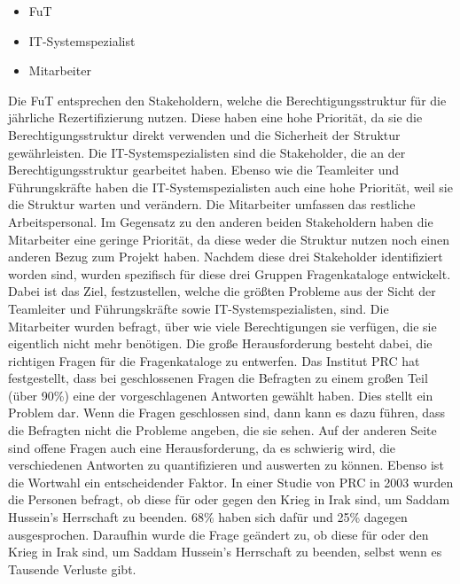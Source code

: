 \begin{itemize}
	\item \ac{FuT}
	\item IT-Systemspezialist
	\item Mitarbeiter
\end{itemize}
Die \ac{FuT} entsprechen den Stakeholdern, welche die Berechtigungsstruktur für die jährliche Rezertifizierung nutzen.
Diese haben eine hohe Priorität, da sie die Berechtigungsstruktur direkt verwenden und die Sicherheit der Struktur gewährleisten.
\newline
Die IT-Systemspezialisten sind die Stakeholder, die an der Berechtigungsstruktur gearbeitet haben.
Ebenso wie die Teamleiter und Führungskräfte haben die IT-Systemspezialisten auch eine hohe Priorität, weil sie die Struktur warten und verändern.
\newline
Die Mitarbeiter umfassen das restliche Arbeitspersonal.
Im Gegensatz zu den anderen beiden Stakeholdern haben die Mitarbeiter eine geringe Priorität, da diese weder die Struktur nutzen noch einen anderen Bezug zum Projekt haben.
\newline
\newline
Nachdem diese drei Stakeholder identifiziert worden sind, wurden spezifisch für diese drei Gruppen Fragenkataloge entwickelt.
Dabei ist das Ziel, festzustellen, welche die größten Probleme aus der Sicht der Teamleiter und Führungskräfte sowie IT-Systemspezialisten, sind.
Die Mitarbeiter wurden befragt, über wie viele Berechtigungen sie verfügen, die sie eigentlich nicht mehr benötigen.
Die große Herausforderung besteht dabei, die richtigen Fragen für die Fragenkataloge zu entwerfen.
Das Institut \ac{PRC} hat festgestellt, dass bei geschlossenen Fragen die Befragten zu einem großen Teil (über 90\%) eine der vorgeschlagenen Antworten gewählt haben. \cite{Survey}
Dies stellt ein Problem dar.
Wenn die Fragen geschlossen sind, dann kann es dazu führen, dass die Befragten nicht die Probleme angeben, die sie sehen.
Auf der anderen Seite sind offene Fragen auch eine Herausforderung, da es schwierig wird, die verschiedenen Antworten zu quantifizieren und auswerten zu können.
Ebenso ist die Wortwahl ein entscheidender Faktor.
In einer Studie von \ac{PRC} in 2003 wurden die Personen befragt, ob diese für oder gegen den Krieg in Irak sind, um Saddam Hussein's Herrschaft zu beenden.
68\% haben sich dafür und 25\% dagegen ausgesprochen.
Daraufhin wurde die Frage geändert zu, ob diese für oder den Krieg in Irak sind, um Saddam Hussein's Herrschaft zu beenden, selbst wenn es Tausende Verluste gibt.
